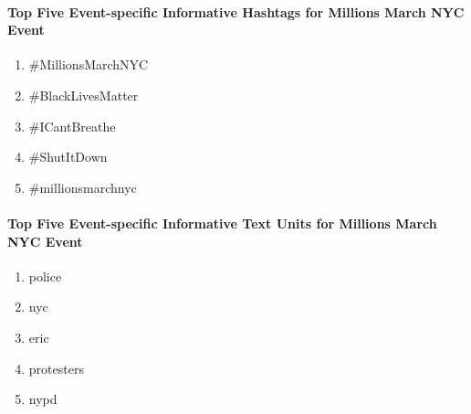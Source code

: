 \paragraph{Top Five Event-specific Informative Hashtags for Millions March NYC Event}
\begin{enumerate}
\item \#MillionsMarchNYC
\item \#BlackLivesMatter
\item \#ICantBreathe
\item \#ShutItDown
\item \#millionsmarchnyc                                                                                                                                                                                                                                                                                                                                                                                                                                                                                                                 
\end{enumerate}

\paragraph{Top Five Event-specific Informative Text Units for Millions March NYC Event}
\begin{enumerate}
\item police
\item nyc
\item eric
\item protesters
\item nypd                                                                                                                                                                                                                                                                                                                                                                                                                                                                                                                
\end{enumerate}


